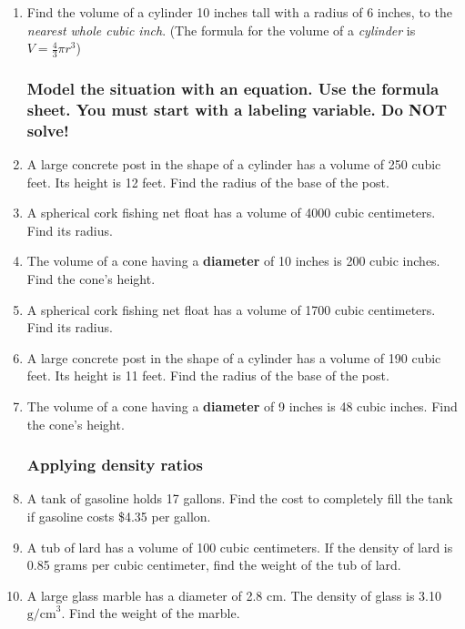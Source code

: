 \begin{enumerate}
\item Find the volume of a cylinder 10 inches tall with a radius of 6 inches, to the \emph{nearest whole cubic inch}. (The formula for the volume of a \emph{cylinder} is $V=\frac{4}{3}\pi r^3$)  %

\subsubsection*{Model the situation with an equation. Use the formula sheet. You must start with a labeling variable. \hfill Do NOT solve!}

\item A large concrete post in the shape of a cylinder has a volume of 250 cubic feet. Its height is 12 feet. Find the radius of the base of the post. %

\item A spherical cork fishing net float has a volume of 4000 cubic centimeters. Find its radius. %

\item The volume of a cone having a \textbf{diameter} of 10 inches is 200 cubic inches. Find the cone's height. %

\item A spherical cork fishing net float has a volume of 1700 cubic centimeters. Find its radius. %

\item A large concrete post in the shape of a cylinder has a volume of 190 cubic feet. Its height is 11 feet. Find the radius of the base of the post. %

\item The volume of a cone having a \textbf{diameter} of 9 inches is 48 cubic inches. Find the cone's height. %


\subsubsection*{Applying density ratios}
\item A tank of gasoline holds 17 gallons. Find the cost to completely fill the tank if gasoline costs \$4.35 per gallon. \vspace{3cm}
\item A tub of lard has a volume of 100 cubic centimeters. If the density of lard is 0.85 grams per cubic centimeter, find the weight of the tub of lard. %
\item A large glass marble has a diameter of 2.8 cm. The density of glass is 3.10 $\mathrm{g/cm}^3$. Find the weight of the marble. %


\end{enumerate}
